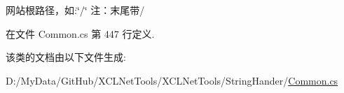网站根路径，如\+:\char`\"{}/\char`\"{} 注：末尾带\textquotesingle{}/\textquotesingle{} 



在文件 Common.\+cs 第 447 行定义.



该类的文档由以下文件生成\+:\begin{DoxyCompactItemize}
\item 
D\+:/\+My\+Data/\+Git\+Hub/\+X\+C\+L\+Net\+Tools/\+X\+C\+L\+Net\+Tools/\+String\+Hander/\hyperlink{_common_8cs}{Common.\+cs}\end{DoxyCompactItemize}
